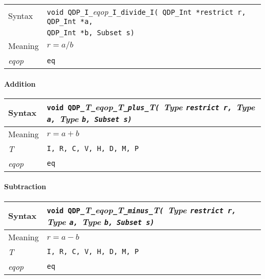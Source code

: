 \documentclass{article}
\newcommand{\tInt}{QDP\ttdash Int }
\newcommand{\namespace}{QDP}
\newcommand{\allNumericTypes}{{\tt I, R, C, V, H, D, M, P}}
\newcommand{\ttdash}{{\tt \_}}
\newcommand{\itt}{\it T}
\newcommand{\extraarg}{, Subset s}
\begin{document}
\begin{flushleft}
  \begin{tabular}{|l|l|}
  \hline
  Syntax      & {\tt void \namespace}\ttdash{\tt I}\ttdash{\it eqop}\ttdash{\tt I}\ttdash{\tt divide}\ttdash{\tt I}{\tt ( \tInt *restrict r, \tInt *a, }\\
              & {\tt \tInt *b\extraarg)} \\
  \hline
  Meaning     & $r = a/b$ \\
  \hline
  {\it eqop}  & {\tt eq} \\
  \hline
  \end{tabular}
\end{flushleft}

\paragraph{Addition}

\begin{flushleft}
  \begin{tabular}{|l|l|}
  \hline
  Syntax      & {\tt void \namespace}\ttdash\itt\ttdash{\it eqop}\ttdash\itt\ttdash{\tt plus}\ttdash\itt{\tt ( }{\it Type }{\tt *restrict r, }{\it Type }{\tt *a, }{\it Type }{\tt *b\extraarg)} \\
  \hline
  Meaning     & $r = a + b$ \\
  \hline
  \itt        & \allNumericTypes \\
  \hline
  {\it eqop}  & {\tt eq} \\
  \hline
  \end{tabular}
\end{flushleft}

\paragraph{Subtraction}

\begin{flushleft}
  \begin{tabular}{|l|l|}
  \hline
  Syntax      & {\tt void \namespace}\ttdash\itt\ttdash{\it eqop}\ttdash\itt\ttdash{\tt minus}\ttdash\itt{\tt ( }{\it Type }{\tt *restrict r, }{\it Type }{\tt *a, }{\it Type }{\tt *b\extraarg)} \\
  \hline
  Meaning     & $r = a - b$ \\
  \hline
  \itt        & \allNumericTypes \\
  \hline
  {\it eqop}  & {\tt eq} \\
  \hline
  \end{tabular}
\end{flushleft}
\end{document}
